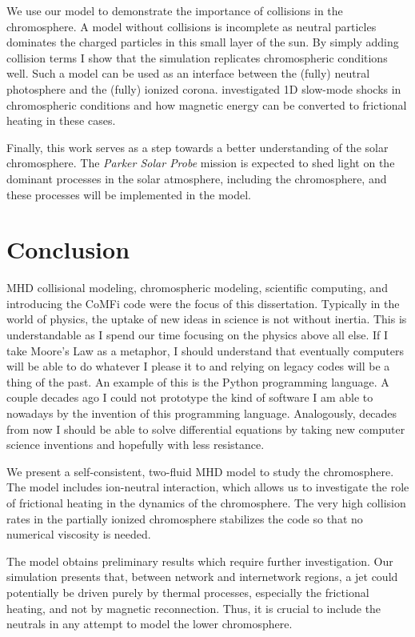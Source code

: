 \documentclass[12pt,upcase]{umlthesis}
\begin{document}
We use our model to demonstrate the importance of collisions in the chromosphere. A model without collisions is incomplete as neutral particles dominates the charged particles in this small layer of the sun. By simply adding collision terms I show that the simulation replicates chromospheric conditions well. Such a model can be used as an interface between the (fully) neutral photosphere and the (fully) ionized corona. \citet{Hillier2016} investigated 1D slow-mode shocks in chromospheric conditions and how magnetic energy can be converted to frictional heating in these cases.

Finally, this work serves as a step towards a better understanding of the solar chromosphere. The {\it Parker Solar Probe\/} mission \citep{SolarProbe16} is expected to shed light on the dominant processes in the solar atmosphere, including the chromosphere, and these processes will be implemented in the model. 

\chapter{Conclusion}\label{chap:conclusion}

MHD collisional modeling, chromospheric modeling, scientific computing, and introducing the CoMFi code were the focus of this dissertation. Typically in the world of physics, the uptake of new ideas in science is not without inertia. This is understandable as I spend our time focusing on the physics above all else. If I take Moore's Law as a metaphor, I should understand that eventually computers will be able to do whatever I please it to and relying on legacy codes will be a thing of the past. An example of this is the Python programming language. A couple decades ago I could not prototype the kind of software I am able to nowadays by the invention of this programming language. Analogously, decades from now I should be able to solve differential equations by taking new computer science inventions and hopefully with less resistance.

We present a self-consistent, two-fluid MHD model to study the chromosphere. The model includes ion-neutral interaction, which allows us to investigate the role of frictional heating in the dynamics of the chromosphere.  The very high collision rates in the partially ionized chromosphere stabilizes the code so that no numerical viscosity is needed.  

The model obtains preliminary results which require further investigation. Our simulation presents that, between network and internetwork regions, a jet could potentially be driven purely by thermal processes, especially the frictional heating, and not by magnetic reconnection. Thus, it is crucial to include the neutrals in any attempt to model the lower chromosphere.
\end{document}
